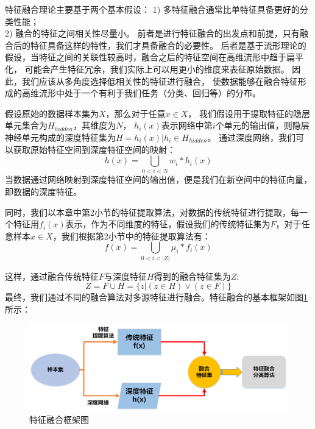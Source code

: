 特征融合理论主要基于两个基本假设：
1) 多特征融合通常比单特征具备更好的分类性能；\\
2) 融合的特征之间相关性尽量小。
前者是进行特征融合的出发点和前提，只有融合后的特征具备这样的特性，我们才具备融合的必要性。
后者是基于流形理论的假设，当特征之间的关联性较高时，融合之后的特征空间在高维流形中趋于扁平化，
可能会产生特征冗余，我们实际上可以用更小的维度来表征原始数据。
因此，我们应该从多角度选择低相关性的特征进行融合，
使数据能够在融合特征形成的高维流形中处于一个有利于我们任务（分类、回归等）的分布。\par

假设原始的数据样本集为$X$，那么对于任意${x \in X}$，
我们假设用于提取特征的隐层单元集合为$H_{hidden}$，其维度为$N$，
$h_i(x)$表示网络中第$i$个单元的输出值，则隐层神经单元构成的深度特征集为$H={h_i(x)|h_i \in H_{hidden}}$。
通过深度网络，我们可以获取原始特征空间到深度特征空间的映射：
\begin{equation}
\label{eqt_4_15}
	h(x) = \bigcup_{0<i<N} w_i * h_{i}(x)
\end{equation}
当数据通过网络映射到深度特征空间的输出值，便是我们在新空间中的特征向量，即数据的深度特征。\par

同时，我们以本章中第2小节的特征提取算法，对数据的传统特征进行提取，每一个特征用$f_{i}(x)$表示，作为不同维度的特征，假设我们的传统特征集为$F$，对于任意样本$x \in X$，我们根据第2小节中的特征提取算法有：
\begin{equation}
\label{eqt_4_16}
	f(x) = \bigcup_{0<i<|Z|}\mu_{i} * f_{i}(x)
\end{equation}

这样，通过融合传统特征$F$与深度特征$H$得到的融合特征集为$Z$:
\begin{equation}
\label{eqt_4_17}
	Z =F \cup H = \{ z | (z \in H) \vee (z \in F) \}
\end{equation}
最终，我们通过不同的融合算法对多源特征进行融合。特征融合的基本框架如图\ref{sec:fig_4_1}所示：

\begin{figure}[!h]
	\centering
	\includegraphics[scale=0.5]{figures/chapter_4/fig_4_1.png}
	\caption{特征融合框架图}\label{sec:fig_4_1}
\end{figure}

